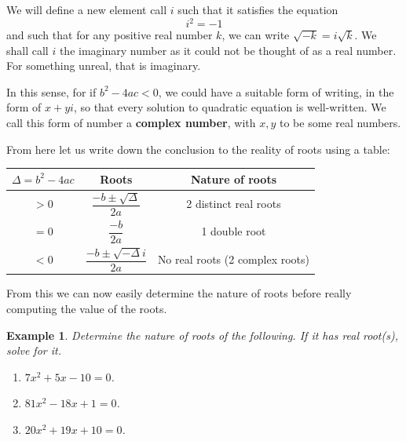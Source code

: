 \documentclass[12pt]{article}
\newtheorem{example}{Example}
\begin{document}
    We will define a new element call $i$ such that it satisfies the equation $$i^2=-1$$ and such that for any positive real number $k$, we can write $\sqrt{-k}=i\sqrt{k}$. We shall call $i$ the imaginary number as it could not be thought of as a real number. For something unreal, that is imaginary.

    In this sense, for if $b^2-4ac<0$, we could have a suitable form of writing, in the form of $x+yi$, so that every solution to quadratic equation is well-written. We call this form of number a \textbf{complex number}, with $x,y$ to be some real numbers.

    From here let us write down the conclusion to the reality of roots using a table:

    \begin{center}
        \begin{tabular}{|c|c|c|}
            \hline
            $\Delta=b^2-4ac$&Roots&Nature of roots\\
            \hline
            $>0$&$\dfrac{-b\pm\sqrt{\Delta}}{2a}$&2 distinct real roots\\
            \hline
            $=0$&$\dfrac{-b}{2a}$&1 double root\\
            \hline
            $<0$&$\dfrac{-b\pm\sqrt{-\Delta}i}{2a}$&No real roots (2 complex roots)\\
            \hline
        \end{tabular}
    \end{center}

    From this we can now easily determine the nature of roots before really computing the value of the roots.

    \begin{example}
        Determine the nature of roots of the following. If it has real root(s), solve for it.\begin{enumerate}
            \item[(a)] $7x^2+5x-10=0$.
            \item[(b)] $81x^2-18x+1=0$.
            \item[(c)] $20x^2+19x+10=0$.
        \end{enumerate}
    \end{example}
\end{document}
